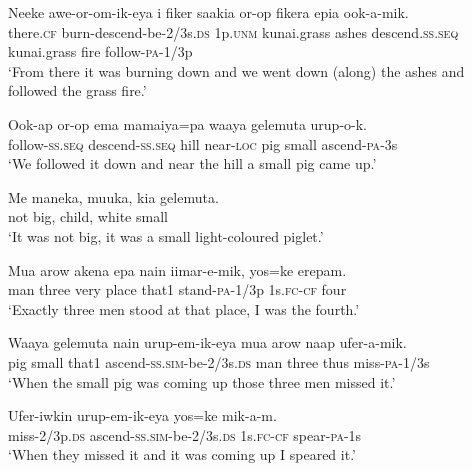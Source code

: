 \ea
\gll  Neeke  awe-or-om-ik-eya  i  fiker  saakia                or-op  fikera  epia  ook-a-mik. \\
there.\textsc{cf}  burn-descend-be-2/3s.\textsc{ds}  1p.\textsc{unm}  kunai.grass  ashes  descend.\textsc{ss.seq}  kunai.grass  fire  follow-\textsc{pa}-1/3p \\


\glt ‘From there it was burning down and we went down (along) the ashes and followed the grass fire.’ \\
\z


\ea
\gll  Ook-ap  or-op  ema  mamaiya=pa  waaya  gelemuta         urup-o-k. \\
follow-\textsc{ss.seq}  descend-\textsc{ss.seq}  hill  near-\textsc{loc}  pig  small     ascend-\textsc{pa}-3s \\


\glt ‘We followed it down and near the hill a small pig came up.’ \\
\z


\ea
\gll  Me  maneka,  muuka,  kia  gelemuta. \\
not  big,  child,  white  small \\
\glt ‘It was not big, it was a small light-coloured piglet.’ \\
\z


\ea
\gll  Mua  arow  akena  epa  nain  iimar-e-mik,  yos=ke  erepam. \\
man  three  very  place  that1  stand-\textsc{pa}-1/3p  1s.\textsc{fc}-\textsc{cf}  four \\
\glt ‘Exactly three men stood at that place, I was the fourth.’ \\
\z


\ea
\gll  Waaya  gelemuta  nain  urup-em-ik-eya  mua  arow  naap  ufer-a-mik. \\
pig  small  that1  ascend-\textsc{ss}.\textsc{sim}-be-2/3s.\textsc{ds}  man  three  thus  miss-\textsc{pa}-1/3s \\
\glt ‘When the small pig was coming up those three men missed it.’ \\
\z


\ea
\gll  Ufer-iwkin  urup-em-ik-eya  yos=ke  mik-a-m. \\
miss-2/3p.\textsc{ds}  ascend-\textsc{ss}.\textsc{sim}-be-2/3s.\textsc{ds}  1s.\textsc{fc}-\textsc{cf}  spear-\textsc{pa}-1s \\
\glt ‘When they missed it and it was coming up I speared it.’ \\
\z


